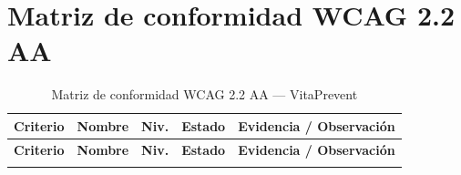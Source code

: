 \documentclass[12pt, a4paper]{report}
\begin{document}
\section{Matriz de conformidad WCAG 2.2 AA}

\begin{longtable}{@{}>{\ttfamily\small}p{1.1cm} p{2.7cm} >{\centering\arraybackslash}p{0.8cm} >{\centering\arraybackslash\small}p{2.2cm} p{4.5cm}@{}}
\caption{Matriz de conformidad WCAG 2.2 AA --- VitaPrevent}
\label{tab:checklist} \\
\toprule
\rowcolor{royalblue!12}
\textbf{Criterio} & \textbf{Nombre} & \textbf{Niv.} & \textbf{Estado} & \textbf{Evidencia / Observación} \\
\midrule
\endfirsthead
\toprule
\rowcolor{royalblue!12}
\textbf{Criterio} & \textbf{Nombre} & \textbf{Niv.} & \textbf{Estado} & \textbf{Evidencia / Observación} \\
\midrule
\endhead
\bottomrule
\endlastfoot


\end{longtable}
\end{document}
